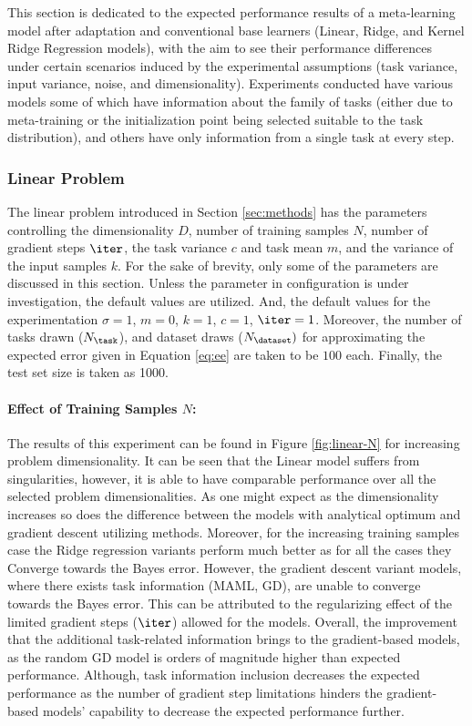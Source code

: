 
This section is dedicated to the expected performance results of a meta-learning model after adaptation and conventional base learners (\eg Linear, Ridge, and Kernel Ridge Regression models), with the aim to see their performance differences under certain scenarios induced by the experimental assumptions (\eg task variance, input variance, noise, and dimensionality). 
Experiments conducted have various models some of which have information about the family of tasks (either due to meta-training or the initialization point being selected suitable to the task distribution), and others have only information from a single task at every step.

\subsubsection{Linear Problem}
The linear problem introduced in Section \ref{sec:methods} has the parameters controlling the dimensionality $D$, number of training samples $N$, number of gradient steps $\iter$, the task variance $c$ and task mean $m$, and the variance of the input samples $k$. For the sake of brevity, only some of the parameters are discussed in this section. Unless the parameter in configuration is under investigation, the default values are utilized. And, the default values for the experimentation $\sigma=1$, $m=0$, $k=1$, $c=1$, $\iter=1$.
Moreover, the number of tasks drawn ($N_{\task}$), and dataset draws ($N_{\dataset})$  for approximating the expected error given in Equation \ref{eq:ee} are taken to be $100$ each. Finally, the test set size is taken as 1000.

\paragraph{Effect of Training Samples $N$:} The results of this experiment can be found in Figure \ref{fig:linear-N} for increasing problem dimensionality. It can be seen that the Linear model suffers from singularities, however, it is able to have comparable performance over all the selected problem dimensionalities. As one might expect as the dimensionality increases so does the difference between the models with analytical optimum and gradient descent utilizing methods. Moreover, for the increasing training samples case the Ridge regression variants perform much better as for all the cases they Converge towards the Bayes error. However, the gradient descent variant models, where there exists task information (\eg MAML, GD), are unable to converge towards the Bayes error. This can be attributed to the regularizing effect of the limited gradient steps ($\iter$) allowed for the models. Overall, the improvement that the additional task-related information brings to the gradient-based models, as the random GD model is orders of magnitude higher than expected performance. Although, task information inclusion decreases the expected performance as the number of gradient step limitations hinders the gradient-based models' capability to decrease the expected performance further.

